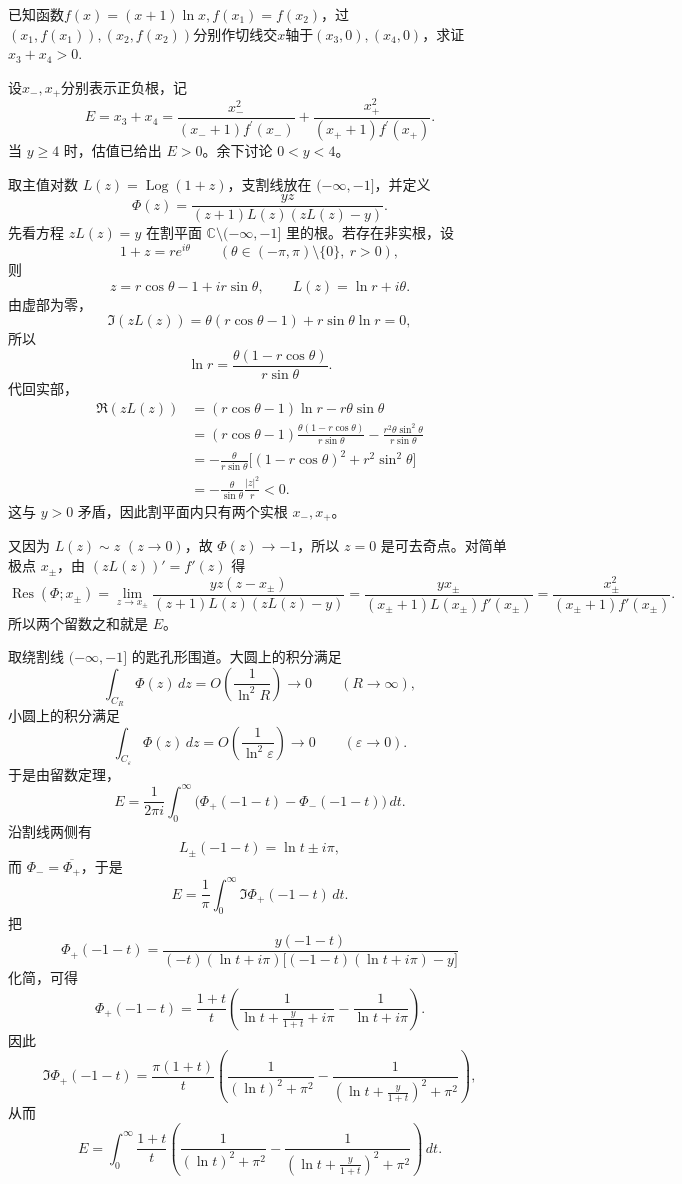 \begin{example}
已知函数$f(x)=(x+1)\ln x,f(x_1)=f(x_2)$，过$(x_1,f(x_1)),(x_2,f(x_2))$分别作切线交$x$轴于$(x_3,0),(x_4,0)$，求证$x_3+x_4>0$.
\end{example}
\begin{solution}
设$x_-,x_+$分别表示正负根，记
$$E=x_3+x_4=\frac{x_{-}^{2}}{(x_{-}+1)f^{\prime}(x_{-})}+\frac{x_{+}^{2}}{(x_{+}+1)f^{\prime}(x_{+})}.$$
当 $y\ge 4$ 时，估值已给出 $E>0$。余下讨论 $0<y<4$。

取主值对数 $L(z)=\operatorname{Log}(1+z)$，支割线放在 $(-\infty,-1]$，并定义
\[
\Phi(z)=\frac{yz}{(z+1)L(z)(zL(z)-y)}.
\]
先看方程 $zL(z)=y$ 在割平面 $\mathbb{C}\setminus(-\infty,-1]$ 里的根。若存在非实根，设
\[
1+z=re^{i\theta}\qquad (\theta\in(-\pi,\pi)\setminus\{0\},\ r>0),
\]
则
\[
z=r\cos\theta-1+ir\sin\theta,\qquad L(z)=\ln r+i\theta.
\]
由虚部为零，
\[
\Im(zL(z))=\theta(r\cos\theta-1)+r\sin\theta\ln r=0,
\]
所以
\[
\ln r=\frac{\theta(1-r\cos\theta)}{r\sin\theta}.
\]
代回实部，
\begin{align*}
\Re(zL(z))
&=(r\cos\theta-1)\ln r-r\theta\sin\theta \\
&=(r\cos\theta-1)\frac{\theta(1-r\cos\theta)}{r\sin\theta}-\frac{r^2\theta\sin^2\theta}{r\sin\theta} \\
&=-\frac{\theta}{r\sin\theta}\bigl[(1-r\cos\theta)^2+r^2\sin^2\theta\bigr] \\
&=-\frac{\theta}{\sin\theta}\frac{|z|^2}{r}<0.
\end{align*}
这与 $y>0$ 矛盾，因此割平面内只有两个实根 $x_-,x_+$。

又因为 $L(z)\sim z$ $(z\to0)$，故 $\Phi(z)\to-1$，所以 $z=0$ 是可去奇点。对简单极点 $x_\pm$，由 $(zL(z))'=f'(z)$ 得
\[
\operatorname{Res}(\Phi;x_\pm)
=\lim_{z\to x_\pm}\frac{yz(z-x_\pm)}{(z+1)L(z)(zL(z)-y)}
=\frac{yx_\pm}{(x_\pm+1)L(x_\pm)f'(x_\pm)}
=\frac{x_\pm^2}{(x_\pm+1)f'(x_\pm)}.
\]
所以两个留数之和就是 $E$。

取绕割线 $(-\infty,-1]$ 的匙孔形围道。大圆上的积分满足
\[
\int_{C_R}\Phi(z)\,dz=O\!\left(\frac{1}{\ln^2R}\right)\to0\qquad (R\to\infty),
\]
小圆上的积分满足
\[
\int_{C_\varepsilon}\Phi(z)\,dz=O\!\left(\frac{1}{\ln^2\varepsilon}\right)\to0\qquad (\varepsilon\to0).
\]
于是由留数定理，
\[
E=\frac{1}{2\pi i}\int_0^\infty\bigl(\Phi_+(-1-t)-\Phi_-(-1-t)\bigr)\,dt.
\]
沿割线两侧有
\[
L_\pm(-1-t)=\ln t\pm i\pi,
\]
而 $\Phi_-=\overline{\Phi_+}$，于是
\[
E=\frac1\pi\int_0^\infty \Im\Phi_+(-1-t)\,dt.
\]
把
\[
\Phi_+(-1-t)=\frac{y(-1-t)}{(-t)(\ln t+i\pi)\bigl[(-1-t)(\ln t+i\pi)-y\bigr]}
\]
化简，可得
\[
\Phi_+(-1-t)=\frac{1+t}{t}\left(\frac{1}{\ln t+\frac{y}{1+t}+i\pi}-\frac{1}{\ln t+i\pi}\right).
\]
因此
\[
\Im\Phi_+(-1-t)=\frac{\pi(1+t)}{t}\left(\frac{1}{(\ln t)^2+\pi^2}-\frac{1}{\left(\ln t+\frac{y}{1+t}\right)^2+\pi^2}\right),
\]
从而
\[
E=\int_0^\infty\frac{1+t}{t}\left(\frac{1}{(\ln t)^2+\pi^2}-\frac{1}{\left(\ln t+\frac{y}{1+t}\right)^2+\pi^2}\right)\,dt.
\]


\end{solution}
